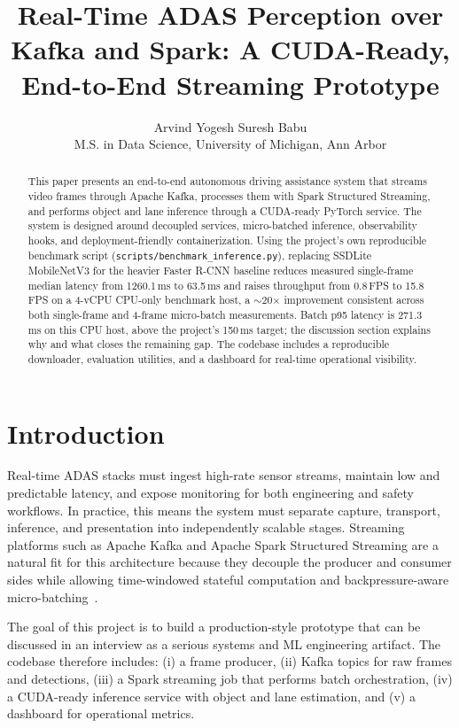 \documentclass[10pt,twocolumn]{article}
\title{\vspace{-0.8em}\textbf{Real-Time ADAS Perception over Kafka and Spark: \newline A CUDA-Ready, End-to-End Streaming Prototype}}
\author{Arvind Yogesh Suresh Babu\\\small M.S. in Data Science, University of Michigan, Ann Arbor}
\date{}
\begin{document}
\maketitle

\begin{abstract}
This paper presents an end-to-end autonomous driving assistance system that streams video frames through Apache Kafka, processes them with Spark Structured Streaming, and performs object and lane inference through a CUDA-ready PyTorch service. The system is designed around decoupled services, micro-batched inference, observability hooks, and deployment-friendly containerization. Using the project's own reproducible benchmark script (\texttt{scripts/benchmark\_inference.py}), replacing SSDLite MobileNetV3 for the heavier Faster R-CNN baseline reduces measured single-frame median latency from 1260.1\,ms to 63.5\,ms and raises throughput from 0.8\,FPS to 15.8\,FPS on a 4-vCPU CPU-only benchmark host, a $\sim$20$\times$ improvement consistent across both single-frame and 4-frame micro-batch measurements. Batch p95 latency is 271.3\,ms on this CPU host, above the project's 150\,ms target; the discussion section explains why and what closes the remaining gap. The codebase includes a reproducible downloader, evaluation utilities, and a dashboard for real-time operational visibility.
\end{abstract}

\section{Introduction}
Real-time ADAS stacks must ingest high-rate sensor streams, maintain low and predictable latency, and expose monitoring for both engineering and safety workflows. In practice, this means the system must separate capture, transport, inference, and presentation into independently scalable stages. Streaming platforms such as Apache Kafka and Apache Spark Structured Streaming are a natural fit for this architecture because they decouple the producer and consumer sides while allowing time-windowed stateful computation and backpressure-aware micro-batching~\cite{kafka,spark}.

The goal of this project is to build a production-style prototype that can be discussed in an interview as a serious systems and ML engineering artifact. The codebase therefore includes: (i) a frame producer, (ii) Kafka topics for raw frames and detections, (iii) a Spark streaming job that performs batch orchestration, (iv) a CUDA-ready inference service with object and lane estimation, and (v) a dashboard for operational metrics.
\end{document}
